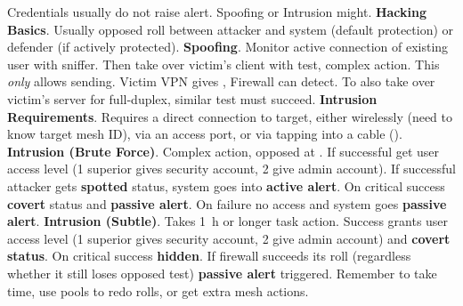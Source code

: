 \begin{itemize}
   \itembox Credentials usually do not raise alert. Spoofing or Intrusion might.
   \itembox \textbf{Hacking Basics}. Usually opposed roll between attacker  and system  (default protection) or defender  (if actively protected).
   \itembox \textbf{Spoofing}. Monitor active connection of existing user with sniffer. Then take over victim's client with  test, complex action. This \textit{only} allows sending. Victim VPN gives , Firewall can detect. To also take over victim's server for full-duplex, similar  test must succeed.
   \itembox \textbf{Intrusion Requirements}. Requires a direct connection to target, either wirelessly (need to know target mesh ID), via an access port, or via tapping into a cable ().
   \itembox \textbf{Intrusion (Brute Force)}. Complex action, opposed  at . If successful get user access level (1 superior gives security account, 2 give admin account). If successful attacker gets \textbf{spotted} status, system goes into \textbf{active alert}. On critical success \textbf{covert} status and \textbf{passive alert}. On failure no access and system goes \textbf{passive alert}.
   \itembox \textbf{Intrusion (Subtle)}. Takes \SI{1}{h} or longer task action. Success grants user access level (1 superior gives security account, 2 give admin account) and \textbf{covert status}. On critical success \textbf{hidden}. If firewall succeeds its roll (regardless whether it still loses opposed test) \textbf{passive alert} triggered.
   \itembox Remember to take time, use pools to redo rolls, or get extra mesh actions.
\end{itemize}



